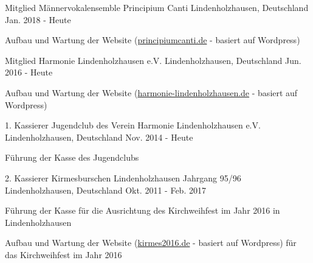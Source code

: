 

\begin{cventries}

  \cventry
    {Mitglied} %
    {Männervokalensemble Principium Canti} %
    {Lindenholzhausen, Deutschland} %
    {Jan. 2018 - Heute} %
    {
      \begin{cvitems} %
        \item {Aufbau und Wartung der Website (\href{http://principiumcanti.de/}{principiumcanti.de} - basiert auf Wordpress)}
      \end{cvitems}
    }

  \cventry
    {Mitglied} %
    {Harmonie Lindenholzhausen e.V.} %
    {Lindenholzhausen, Deutschland} %
    {Jun. 2016 - Heute} %
    {
      \begin{cvitems} %
        \item {Aufbau und Wartung der Website (\href{http://chorhp.harmonie-festival.de/}{harmonie-lindenholzhausen.de} - basiert auf Wordpress)}
      \end{cvitems}
    }

  \cventry
    {1. Kassierer} %
    {Jugendclub des Verein Harmonie Lindenholzhausen e.V.} %
    {Lindenholzhausen, Deutschland} %
    {Nov. 2014 - Heute} %
    {
      \begin{cvitems} %
       \item {Führung der Kasse des Jugendclubs}
      \end{cvitems}
    }

  \cventry
    {2. Kassierer} %
    {Kirmesburschen Lindenholzhausen Jahrgang 95/96} %
    {Lindenholzhausen, Deutschland} %
    {Okt. 2011 - Feb. 2017} %
    {
      \begin{cvitems} %
        \item {Führung der Kasse für die Ausrichtung des Kirchweihfest im Jahr 2016 in Lindenholzhausen}
        \item {Aufbau und Wartung der Website (\href{http://kirmes2016.de/}{kirmes2016.de} - basiert auf Wordpress) für das Kirchweihfest im Jahr 2016}
      \end{cvitems}
    }

\end{cventries}
